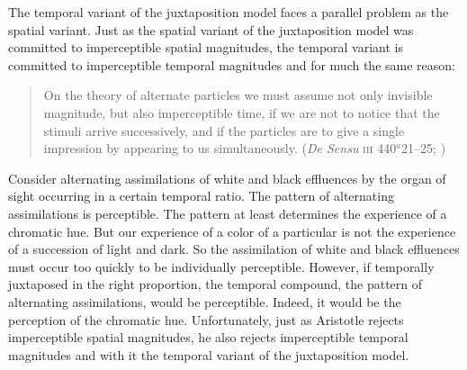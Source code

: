 The temporal variant of the juxtaposition model faces a parallel problem as the spatial variant. Just as the spatial variant of the juxtaposition model was committed to imperceptible spatial magnitudes, the temporal variant is committed to imperceptible temporal magnitudes and for much the same reason:
\begin{quote}
	On the theory of alternate particles we must assume not only invisible magnitude, but also imperceptible time, if we are not to notice that the stimuli arrive successively, and if the particles are to give a single impression by appearing to us simultaneously. (\emph{De Sensu} \textsc{iii} 440\( ^{a} \)21--25; \citealt[235]{Hett:1936fk})
\end{quote}
Consider alternating assimilations of white and black effluences by the organ of sight occurring in a certain temporal ratio. The pattern of alternating assimilations is perceptible. The pattern at least determines the experience of a chromatic hue. But our experience of a color of a particular is not the experience of a succession of light and dark. So the assimilation of white and black effluences must occur too quickly to be individually perceptible. However, if temporally juxtaposed in the right proportion, the temporal compound, the pattern of alternating assimilations, would be perceptible.  Indeed, it would be the perception of the chromatic hue. Unfortunately, just as Aristotle rejects imperceptible spatial magnitudes, he also rejects imperceptible temporal magnitudes and with it the temporal variant of the juxtaposition model.


